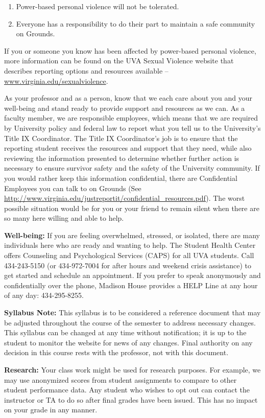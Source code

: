 \documentclass[12pt]{article}
\begin{document}
\begin{enumerate}
    \item Power-based personal violence will not be tolerated. 
    \item Everyone has a responsibility to do their part to maintain a safe community on Grounds.
\end{enumerate}

If you or someone you know has been affected by power-based personal violence, more information can be found on the UVA Sexual Violence website that describes reporting options and resources available -- \url{www.virginia.edu/sexualviolence}. 
   
As your professor and as a person, know that we each care about you and your well-being and stand ready to provide support and resources as we can. As a faculty member, we are responsible employees, which means that we are required by University policy and federal law to report what you tell us to the University's Title IX Coordinator. The Title IX Coordinator's job is to ensure that the reporting student receives the resources and support that they need, while also reviewing the information presented to determine whether further action is necessary to ensure survivor safety and the safety of the University community. If you would rather keep this information confidential, there are Confidential Employees you can talk to on Grounds (See \url{http://www.virginia.edu/justreportit/confidential\_resources.pdf}). The worst possible situation would be for you or your friend to remain silent when there are so many here willing and able to help.

\textbf{Well-being:} If you are feeling overwhelmed, stressed, or isolated, there are many individuals here who are ready and wanting to help. The Student Health Center offers Counseling and Psychological Services (CAPS) for all UVA students. Call 434-243-5150 (or 434-972-7004 for after hours and weekend crisis assistance) to get started and schedule an appointment. If you prefer to speak anonymously and confidentially over the phone, Madison House provides a HELP Line at any hour of any day: 434-295-8255.

\textbf{Syllabus Note:} This syllabus is to be considered a reference document that may be adjusted throughout the course of the semester to address necessary changes. This syllabus can be changed at any time without notification; it is up to the student to monitor the website for news of any changes. Final authority on any decision in this course rests with the professor, not with this document.

\textbf{Research:}
Your class work might be used for research purposes. For example, we may use anonymized scores from student assignments to compare to other student performance data. Any student who wishes to opt out can contact the instructor or TA to do so after final grades have been issued. This has no impact on your grade in any manner. 
\end{document}
